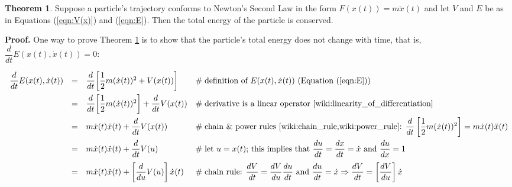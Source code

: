 \documentclass{article}
\theoremstyle{definition}
\newtheorem{theorem}{Theorem}[section]
\begin{document}
\medskip
\begin{theorem}
\label{theorem:conservation_of_energy_in_R1}
Suppose a particle's trajectory conforms to Newton’s Second Law 
in the form $F(x(t)) = m\ddot{x}(t)$ and let $V$ and $E$ be as 
in Equations (\ref{eqn:V(x)}) and (\ref{eqn:E}). Then the total 
energy of the particle is conserved.

\medskip
{
\noindent
{\bf Proof.} One way to prove Theorem \ref{theorem:conservation_of_energy_in_R1}
is to show that the particle's total energy does not change with time, 
that is,$\dfrac{d}{dt}E(x(t),\dot{x}(t)) = 0$:
\par}
%
%
%
\begin{equation*}
\begin{array}{llll}
\dfrac{d}{dt} E(x(t),\dot{x}(t))
&=& \dfrac{d}{dt} \bigg [\dfrac{1}{2}m(\dot{x}(t))^{2} + V(x(t)) \bigg ]
		&\hspace{0em} \mathrel{\#} \text{definition of $E(x(t),\dot{x}(t))$ 
		                                 (Equation (\ref{eqn:E}))} \\		
[10pt]
&=& \dfrac{d}{dt} \bigg [ \dfrac{1}{2}m(\dot{x}(t))^{2} \bigg ] + \dfrac{d}{dt} V(x(t))
		&\hspace{0em} \mathrel{\#} \text{derivative is a linear 
		                                 operator \cite{wiki:linearity_of_differentiation}} \\
[10pt]
&=& m\dot{x}(t)\ddot{x}(t) + \dfrac{d}{dt} V(x(t))
		&\hspace{0em} \mathrel{\#} \text{chain \& power rules \cite{wiki:chain_rule,wiki:power_rule}:
										 $\dfrac{d}{dt} \left [  \dfrac{1}{2}m(\dot{x}(t))^{2} \right ] = 
										 m\dot{x}(t)\ddot{x}(t)$} \\
[10pt]
&=& m\dot{x}(t)\ddot{x}(t) + \dfrac{d}{dt} V(u)
		&\hspace{0em} \mathrel{\#} \text{let $u = x(t)$; this implies that
		                                 $\dfrac{du}{dt} = \dfrac{dx}{dt} = \dot{x}$
		                                 and 
		                                 $\dfrac{du}{dx} = 1$} \\
[10pt]
&=& m\dot{x}(t)\ddot{x}(t) + \left [\dfrac{d}{du}  V(u) \right ] \dot{x}(t)
		&\hspace{0em} \mathrel{\#} \text{chain rule: 
								         $\dfrac{dV}{dt} = 
					                     \dfrac{dV}{du} \dfrac{du}{dt}$
					                     and
							             $\dfrac{du}{dt} = \dot{x} 
							             \Rightarrow 
							             \dfrac{dV}{dt} = \left [\dfrac{dV}{du} \right ]\dot{x}$} \\

\end{array}
\end{equation*}
\end{theorem}
\end{document}
